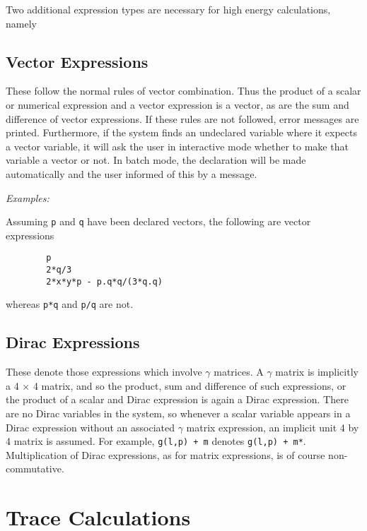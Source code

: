 Two additional expression types are necessary for high energy
calculations, namely

\subsection{Vector Expressions}

These follow the normal rules of vector combination. Thus the product of a
scalar or numerical expression and a vector expression is a vector, as are
the sum and difference of vector expressions. If these rules are not
followed, error messages are printed. Furthermore, if the system finds an
undeclared variable where it expects a vector variable, it will ask the
user in interactive mode whether to make that variable a vector or not. In
batch mode, the declaration will be made automatically and the user
informed of this by a message.

\textit{Examples:}

Assuming \texttt{p} and \texttt{q} have been declared vectors, the following are
vector expressions
\begin{verbatim}
        p
        2*q/3
        2*x*y*p - p.q*q/(3*q.q)
\end{verbatim}
whereas \texttt{p*q} and \texttt{p/q} are not.

\subsection{Dirac Expressions}

These denote those expressions which involve $\gamma$ matrices. A $\gamma$
matrix is implicitly a 4 $\times$ 4 matrix, and so the product, sum and
difference of such expressions, or the product of a scalar and Dirac
expression is again a Dirac expression.  There are no Dirac variables in
the system, so whenever a scalar variable appears in a Dirac expression
without an associated $\gamma$ matrix expression, an implicit unit 4
by 4 matrix is assumed.  For example, \texttt{g(l,p) + m} denotes 
\texttt{g(l,p) + m*}.  Multiplication of Dirac
expressions, as for matrix expressions, is of course non-commutative.

\section{Trace Calculations}
\hypertarget{command:NOSPUR}{}
\hypertarget{command:SPUR}{}

